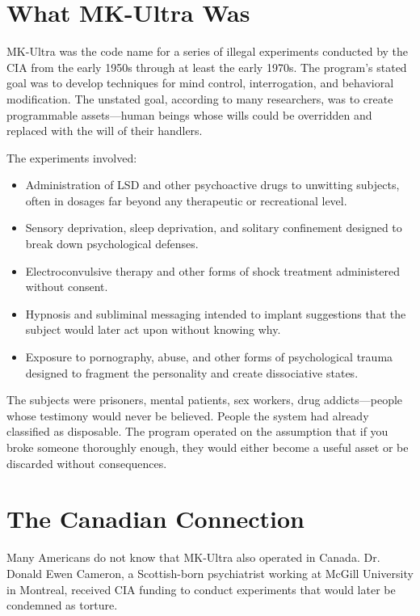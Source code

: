 \documentclass[11pt,openany]{book}
\begin{document}
\section*{What MK-Ultra Was}

MK-Ultra was the code name for a series of illegal experiments conducted by the CIA from the early 1950s through at least the early 1970s. The program's stated goal was to develop techniques for mind control, interrogation, and behavioral modification. The unstated goal, according to many researchers, was to create programmable assets---human beings whose wills could be overridden and replaced with the will of their handlers.

The experiments involved:

\begin{itemize}
\item Administration of LSD and other psychoactive drugs to unwitting subjects, often in dosages far beyond any therapeutic or recreational level.
\item Sensory deprivation, sleep deprivation, and solitary confinement designed to break down psychological defenses.
\item Electroconvulsive therapy and other forms of shock treatment administered without consent.
\item Hypnosis and subliminal messaging intended to implant suggestions that the subject would later act upon without knowing why.
\item Exposure to pornography, abuse, and other forms of psychological trauma designed to fragment the personality and create dissociative states.
\end{itemize}

The subjects were prisoners, mental patients, sex workers, drug addicts---people whose testimony would never be believed. People the system had already classified as disposable. The program operated on the assumption that if you broke someone thoroughly enough, they would either become a useful asset or be discarded without consequences.

\section*{The Canadian Connection}

Many Americans do not know that MK-Ultra also operated in Canada. Dr. Donald Ewen Cameron, a Scottish-born psychiatrist working at McGill University in Montreal, received CIA funding to conduct experiments that would later be condemned as torture.
\end{document}
